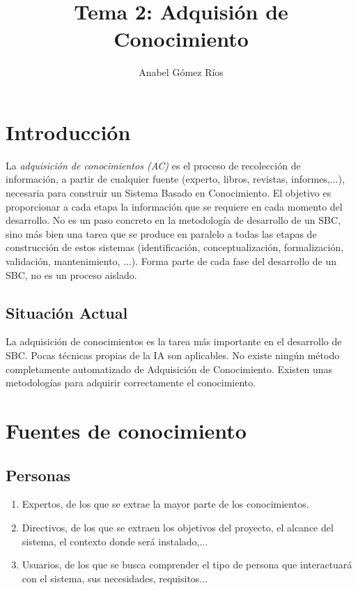 \documentclass[12pt]{article}
\title{Tema 2: Adquisión de Conocimiento}
\author{Anabel G\'omez R\'ios}
\begin{document}
\maketitle


\section{Introducción}
La \textit{adquisición de conocimientos (AC)} es el proceso de recolección de información, a partir de cualquier fuente (experto, libros, revistas, informes,...), necesaria para construir un Sistema Basado en Conocimiento. El objetivo es proporcionar a cada etapa la información que se requiere en cada momento del desarrollo. No es un paso concreto en la metodología de desarrollo de un SBC, sino más bien una tarea que se produce en paralelo a todas las etapas de construcción de estos sistemas (identificación, conceptualización, formalización, validación, mantenimiento, ...). Forma parte de cada fase del desarrollo de un SBC, no es un proceso aislado.

\subsection{Situación Actual}
La adquisición de conocimientos es la tarea más importante en el desarrollo de SBC. Pocas técnicas propias de la IA son aplicables. No existe ningún método completamente automatizado de Adquisición de Conocimiento. Existen unas metodologías para adquirir correctamente el conocimiento.

\section{Fuentes de conocimiento}
\subsection{Personas}
\begin{enumerate}
\item Expertos, de los que se extrae la mayor parte de los conocimientos.
\item Directivos, de los que se extraen los objetivos del proyecto, el alcance del sistema, el contexto donde será instalado,...
\item Usuarios, de los que se busca comprender el tipo de persona que interactuará con el sistema, sus necesidades, requisitos...
\end{enumerate}
\end{document}

